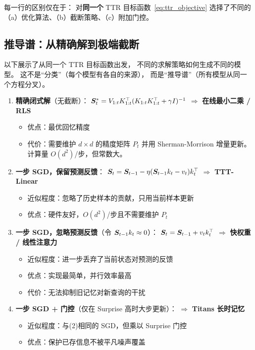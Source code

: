 每一行的区别仅在于：
对\textbf{同一个} TTR 目标函数~\eqref{eq:ttr_objective}
选择了不同的（a）优化算法、（b）截断策略、（c）附加门控。

\subsection*{推导谱：从精确解到极端截断}

以下展示了从同一个 TTR 目标函数出发，
不同的求解策略如何生成不同的模型。
这不是``分类''（每个模型有各自的来源），
而是``推导谱''（所有模型从同一个方程分叉）。

\begin{enumerate}
  \item \textbf{精确闭式解}（无截断）：
    $\boldsymbol{S}_t^* = V_{1:t} K_{1:t}^\top (K_{1:t} K_{1:t}^\top + \gamma I)^{-1}$
    $\Rightarrow$ \textbf{在线最小二乘 / RLS}
    \begin{itemize}
      \item 优点：最优回忆精度
      \item 代价：需要维护 $d \times d$ 的精度矩阵 $P_t$
        并用 Sherman-Morrison 增量更新。计算量 $O(d^2)$/步，但常数大。
    \end{itemize}

  \item \textbf{一步 SGD，保留预测反馈}：
    $\boldsymbol{S}_t = \boldsymbol{S}_{t-1} - \eta (\boldsymbol{S}_{t-1} k_t - v_t) k_t^\top$
    $\Rightarrow$ \textbf{TTT-Linear}
    \begin{itemize}
      \item 近似程度：忽略了历史样本的贡献，只用当前样本更新
      \item 优点：硬件友好，$O(d^2)$/步且不需要维护 $P_t$
    \end{itemize}

  \item \textbf{一步 SGD，忽略预测反馈}（令 $\boldsymbol{S}_{t-1} k_t \approx 0$）：
    $\boldsymbol{S}_t = \boldsymbol{S}_{t-1} + v_t k_t^\top$
    $\Rightarrow$ \textbf{快权重 / 线性注意力}
    \begin{itemize}
      \item 近似程度：进一步丢弃了当前状态对预测的反馈
      \item 优点：实现最简单，并行效率最高
      \item 代价：无法抑制旧记忆对新查询的干扰
    \end{itemize}

  \item \textbf{一步 SGD + 门控}（仅在 Surprise 高时大步更新）：
    $\Rightarrow$ \textbf{Titans 长时记忆}
    \begin{itemize}
      \item 近似程度：与(2)相同的 SGD，但乘以 Surprise 门控
      \item 优点：保护已存信息不被平凡噪声覆盖
    \end{itemize}


\end{enumerate}
